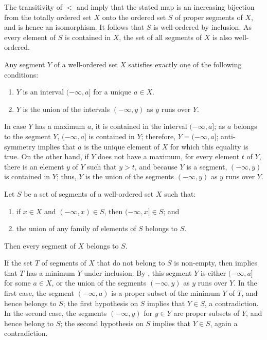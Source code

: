 \documentclass{article}
\begin{document}
The transitivity of \(<\) and  imply that the
stated map is an increasing bijection from the totally ordered set
\(X\) onto the ordered set \(S\) of proper segments of \(X\), and is
hence an isomorphism.  It follows that \(S\) is well-ordered by
inclusion.  As every element of \(S\) is contained in \(X\), the set
of all segments of \(X\) is also well-ordered.

\begin{theorem}
  \label{thm:36vndfrs}
  Any segment \(Y\) of a well-ordered set \(X\) satisfies exactly one
  of the following conditions:
  \begin{enumerate}
  \item \(Y\) is an interval \((-\infty, a]\) for a unique
    \(a \in X\).
  \item \(Y\) is the union of the intervals \((-\infty, y)\) as \(y\)
    runs over \(Y\).
  \end{enumerate}
\end{theorem}

In case \(Y\) has a maximum \(a\), it is contained in the interval
\((-\infty, a]\); as \(a\) belongs to the segment \(Y\),
\((-\infty, a]\) is contained in \(Y\); therefore,
\(Y = (-\infty, a]\); anti-symmetry implies that \(a\) is the unique
element of \(X\) for which this equality is true.  On the other hand,
if \(Y\) does not have a maximum, for every element \(t\) of \(Y\),
there is an element \(y\) of \(Y\) such that \(y > t\), and because
\(Y\) is a segment, \((-\infty, y)\) is contained in \(Y\); thus,
\(Y\) is the union of the segments \((-\infty, y)\) as \(y\) runs over
\(Y\).

\begin{theorem}
  \label{thm:y3go6w2h}
  Let \(S\) be a set of segments of a well-ordered set \(X\) such
  that:
  \begin{enumerate}
  \item if \(x \in X\) and \((-\infty, x) \in S\), then
    \((-\infty, x] \in S\); and
  \item the union of any family of elements of \(S\) belongs to \(S\).
  \end{enumerate}
  Then every segment of \(X\) belongs to \(S\).
\end{theorem}

If the set \(T\) of segments of \(X\) that do not belong to \(S\) is
non-empty, then  implies that \(T\) has a minimum
\(Y\) under inclusion.  By , this segment \(Y\) is
either \((-\infty, a]\) for some \(a \in X\), or the union of the
segments \((-\infty, y)\) as \(y\) runs over \(Y\).  In the first
case, the segment \((-\infty, a)\) is a proper subset of the minimum
\(Y\) of \(T\), and hence belongs to \(S\); the first hypothesis on
\(S\) implies that \(Y \in S\), a contradiction.  In the second case,
the segments \((-\infty, y)\) for \(y \in Y\) are proper subsets of
\(Y\), and hence belong to \(S\); the second hypothesis on \(S\)
implies that \(Y \in S\), again a contradiction.
\end{document}
